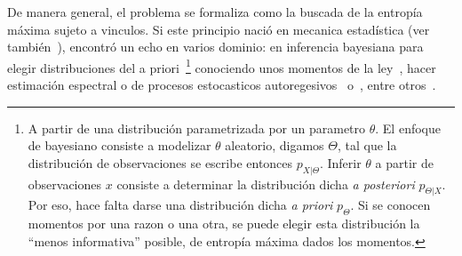 De  manera general,  el problema  se formaliza  como la  buscada de  la entrop\'ia
m\'axima sujeto  a vinculos. Si  este principio naci\'o en  mecanica estad\'istica
(ver  tambi\'en~\cite{Jay57,  Jay57:2, Jay65}),  encontr\'o  un  echo en  varios
dominio:   en   inferencia   bayesiana   para  elegir   distribuciones   del   a
priori~\footnote{A partir  de una distribuci\'on parametrizada  por un parametro
  $\theta$.  El  enfoque de bayesiano  consiste a modelizar  $\theta$ aleatorio,
  digamos  $\Theta$,  tal que  la  distribuci\'on  de  observaciones se  escribe
  entonces  $p_{X|\Theta}$.   Inferir $\theta$  a  partir  de observaciones  $x$
  consiste   a   determinar  la   distribuci\'on   dicha   {\it  a   posteriori}
  $p_{\Theta|X}$.  Por  eso, hace  falta darse una  distribuci\'on dicha  {\it a
    priori} $p_\Theta$.   Si se conocen  momentos por una  razon o una  otra, se
  puede  elegir esta  distribuci\'on la  ``menos informativa''  posible,  \ie de
  entrop\'ia  m\'axima dados  los momentos.\label{foot:SZ:Prior}}  conociendo unos
momentos  de  la  ley~\cite{Rob07,  Jay68,  Jay82,  Csi91},  hacer  estimaci\'on
espectral  o de procesos  estocasticos autoregesivos~\cite{Bur67,  Bur75, Jay82}
o~\cite[cap.~12]{CovTho06}, entre otros~\cite[\& ref.]{KapKes92}.

